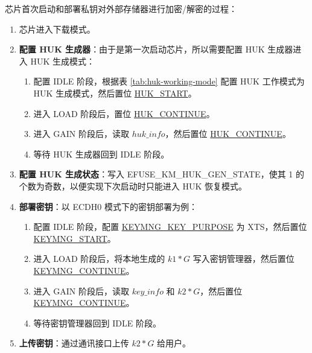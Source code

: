 \documentclass[main\_\_CN.tex]{subfiles}
\begin{document}
芯片首次启动和部署私钥对外部存储器进行加密/解密的过程：

\begin{enumerate}
    \item 芯片进入下载模式。
    \item \textbf{配置 HUK 生成器}：由于是第一次启动芯片，所以需要配置 HUK 生成器进入 HUK 生成模式：
    \begin{enumerate}
        \item 配置 IDLE 阶段，根据表 \ref{tab:huk-working-mode} 配置 HUK 工作模式为 HUK 生成模式，然后置位  \hyperref[fielddesc:HUKSTART]{HUK\_START}。
        \item 进入 LOAD 阶段后，置位 \hyperref[fielddesc:HUKCONTINUE]{HUK\_CONTINUE}。
        \item 进入 GAIN 阶段后，读取 \hyperref[para:hukinfo]{\begin{math}huk\_info\end{math}}，然后置位 \hyperref[fielddesc:HUKCONTINUE]{HUK\_CONTINUE}。
        \item 等待 HUK 生成器回到 IDLE 阶段。
    \end{enumerate}
    \item \textbf{配置 HUK 生成状态}：写入 EFUSE\_KM\_HUK\_GEN\_STATE，使其 1 的个数为奇数，以便实现下次启动时只能进入 HUK 恢复模式。
    \item \textbf{部署密钥}：以 ECDH0 模式下的密钥部署为例：
    \begin{enumerate}
        \item 配置 IDLE 阶段，配置  \hyperref[fielddesc:KEYMNGKEYPURPOSE]{KEYMNG\_KEY\_PURPOSE} 为 XTS，然后置位  \hyperref[fielddesc:KEYMNGSTART]{KEYMNG\_START}。
        \item 进入 LOAD 阶段后，将本地生成的 \hyperref[para:k1G]{\begin{math}k1*G\end{math}} 写入密钥管理器，然后置位  \hyperref[fielddesc:KEYMNGCONTINUE]{KEYMNG\_CONTINUE}。
        \item 进入 GAIN 阶段后，读取 \hyperref[para:keyinfo]{\begin{math}key\_info\end{math}} 和 \hyperref[para:k2G]{\begin{math}k2*G\end{math}}，然后置位  \hyperref[fielddesc:KEYMNGCONTINUE]{KEYMNG\_CONTINUE}。
        \item 等待密钥管理器回到 IDLE 阶段。
    \end{enumerate}
    \item \textbf{上传密钥}：通过通讯接口上传 \hyperref[para:k2G]{\begin{math}k2*G\end{math}} 给用户。

\end{enumerate}
\end{document}
